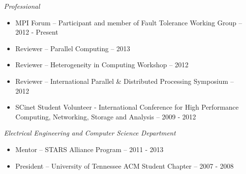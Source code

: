 {\sl Professional}
\begin{itemize}
    \item MPI Forum -- Participant and member of Fault Tolerance Working Group -- 2012 - Present
    \item Reviewer -- Parallel Computing -- 2013
    \item Reviewer -- Heterogeneity in Computing Workshop -- 2012
    \item Reviewer -- International Parallel \& Distributed Processing Symposium -- 2012
    \item SCinet Student Volunteer - International Conference for High Performance Computing, Networking, Storage and Analysis -- 2009 - 2012
\end{itemize}

{\sl Electrical Engineering and Computer Science Department}
\begin{itemize}
    \item Mentor -- STARS Alliance Program -- 2011 - 2013
    \item President -- University of Tennessee ACM Student Chapter -- 2007 - 2008
\end{itemize}
